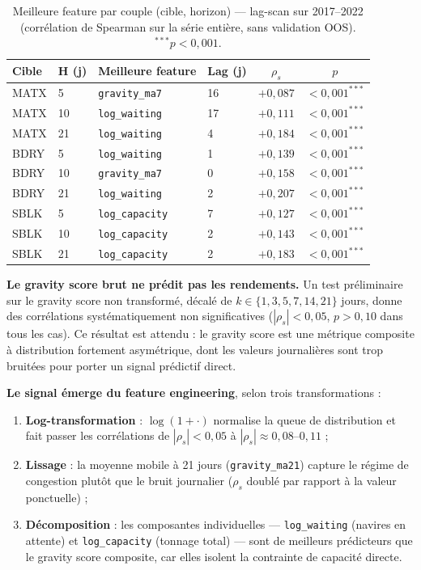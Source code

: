 \begin{table}[ht]
\centering
\caption{Meilleure feature par couple (cible, horizon) --- lag-scan sur 2017--2022
(corrélation de Spearman sur la série entière, sans validation OOS). $^{***}p<0{,}001$.}
\label{tab:lagscan}
\small
\begin{tabular}{llllcc}
\toprule
\textbf{Cible} & \textbf{H (j)} & \textbf{Meilleure feature} & \textbf{Lag (j)} &
$\rho_s$ & $p$ \\
\midrule
MATX &  5 & \texttt{gravity\_ma7}    & 16 & $+0{,}087$ & $<0{,}001^{***}$ \\
MATX & 10 & \texttt{log\_waiting}    & 17 & $+0{,}111$ & $<0{,}001^{***}$ \\
MATX & 21 & \texttt{log\_waiting}    &  4 & $+0{,}184$ & $<0{,}001^{***}$ \\
\addlinespace
BDRY &  5 & \texttt{log\_waiting}    &  1 & $+0{,}139$ & $<0{,}001^{***}$ \\
BDRY & 10 & \texttt{gravity\_ma7}    &  0 & $+0{,}158$ & $<0{,}001^{***}$ \\
BDRY & 21 & \texttt{log\_waiting}    &  2 & $+0{,}207$ & $<0{,}001^{***}$ \\
\addlinespace
SBLK &  5 & \texttt{log\_capacity}   &  7 & $+0{,}127$ & $<0{,}001^{***}$ \\
SBLK & 10 & \texttt{log\_capacity}   &  2 & $+0{,}143$ & $<0{,}001^{***}$ \\
SBLK & 21 & \texttt{log\_capacity}   &  2 & $+0{,}183$ & $<0{,}001^{***}$ \\
\bottomrule
\end{tabular}
\end{table}

\noindent
\textbf{Le gravity score brut ne prédit pas les rendements.}
Un test préliminaire sur le gravity score non transformé, décalé de $k \in
\{1,3,5,7,14,21\}$ jours, donne des corrélations systématiquement non
significatives ($|\rho_s| < 0{,}05$, $p > 0{,}10$ dans tous les cas). Ce
résultat est attendu : le gravity score est une métrique composite à
distribution fortement asymétrique, dont les valeurs journalières sont trop
bruitées pour porter un signal prédictif direct.

\textbf{Le signal émerge du feature engineering}, selon trois transformations :
\begin{enumerate}
    \item \textbf{Log-transformation} : $\log(1 + \cdot)$ normalise la queue
    de distribution et fait passer les corrélations de $|\rho_s| < 0{,}05$ à
    $|\rho_s| \approx 0{,}08$--$0{,}11$ ;
    \item \textbf{Lissage} : la moyenne mobile à 21 jours (\texttt{gravity\_ma21})
    capture le régime de congestion plutôt que le bruit journalier ($\rho_s$
    doublé par rapport à la valeur ponctuelle) ;
    \item \textbf{Décomposition} : les composantes individuelles ---
    \texttt{log\_waiting} (navires en attente) et \texttt{log\_capacity}
    (tonnage total) --- sont de meilleurs prédicteurs que le gravity score
    composite, car elles isolent la contrainte de capacité directe.
\end{enumerate}


